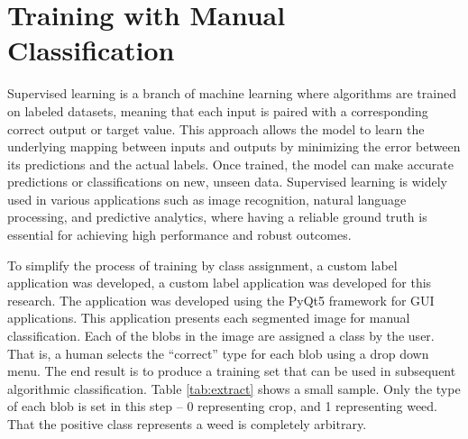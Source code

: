 \documentclass[letterpaper, notitlepage]{report}
\begin{document}
\section{Training with Manual Classification}
Supervised learning is a branch of machine learning where algorithms are trained on labeled datasets, meaning that each input is paired with a corresponding correct output or target value. This approach allows the model to learn the underlying mapping between inputs and outputs by minimizing the error between its predictions and the actual labels. Once trained, the model can make accurate predictions or classifications on new, unseen data. Supervised learning is widely used in various applications such as image recognition, natural language processing, and predictive analytics, where having a reliable ground truth is essential for achieving high performance and robust outcomes.  

To simplify the process of training by class assignment, a custom label application was developed, a custom label application was developed for this research. The application was developed using the PyQt5 framework for GUI applications. This application presents each segmented image for manual classification. Each of the blobs in the image are assigned a class by the user. That is, a human selects the ``correct'' type for each blob using a drop down menu. The end result is to produce a training set that can be used in subsequent algorithmic classification. Table \ref{tab:extract} shows a small sample. Only the type of each blob is set in this step -- 0 representing crop, and 1 representing weed. That the positive class represents a weed is completely arbitrary.
\end{document}
